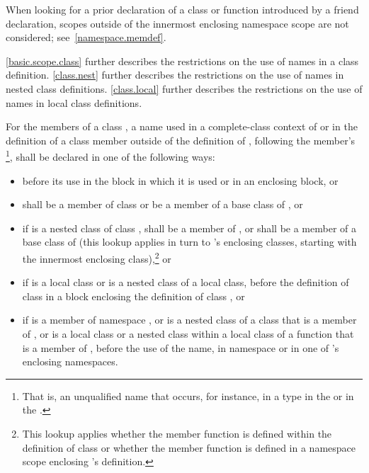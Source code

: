 \begin{note}
When looking for a prior declaration of a class
or function introduced by a friend declaration, scopes outside
of the innermost enclosing namespace scope are not considered;
see~\ref{namespace.memdef}. \end{note} \begin{note} \ref{basic.scope.class}
further describes the restrictions on the use of names in a class
definition. \ref{class.nest} further describes the restrictions on the
use of names in nested class definitions. \ref{class.local} further
describes the restrictions on the use of names in local class
definitions.
\end{note}

\pnum
For the members of a class , a name used
in a complete-class context of  or
in the definition of a class member outside of the definition of ,
following the member's
\footnote{That is, an unqualified name that occurs,
for instance, in a
type in the
 or in the
.}, shall be declared in one of the
following ways:
\begin{itemize}
\item before its use in the block in which it is used or in an enclosing
block, or

\item shall be a member of class  or be a member of a base
class of , or

\item if 
is a nested class of class , shall be a
member of , or shall be a member of a base class of 
(this lookup applies in turn to 's enclosing classes, starting
with the innermost enclosing class),\footnote{This lookup applies whether
the member function is defined
within the definition of class  or whether the member function
is defined in a namespace scope enclosing 's definition.}
or

\item if  is a local class or is a nested
class of a local class, before the definition of class  in a
block enclosing the definition of class , or

\item if  is a member of namespace , or is a nested
class of a class that is a member of , or is a local class or a
nested class within a local class of a function that is a member of
, before the use of the name, in namespace 
or in one of 's enclosing namespaces.
\end{itemize}
